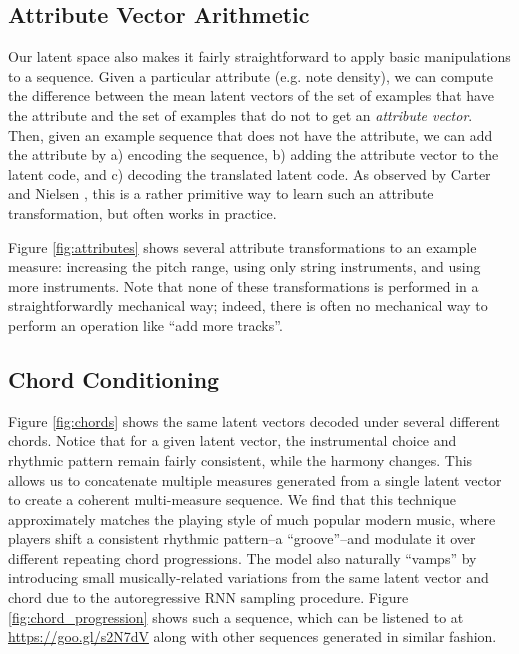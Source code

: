 \documentclass{article}
\begin{document}
\subsection{Attribute Vector Arithmetic}
\label{subsec:attribute}
Our latent space also makes it fairly straightforward to apply basic manipulations to a sequence.  Given a particular attribute (e.g. note density), we can compute the difference between the mean latent vectors of the set of examples that have the attribute and the set of examples that do not to get an {\it attribute vector}.  Then, given an example sequence that does not have the attribute, we can add the attribute by a) encoding the sequence, b) adding the attribute vector to the latent code, and c) decoding the translated latent code.  As observed by Carter and Nielsen \cite{carter2017using}, this is a rather primitive way to learn such an attribute transformation, but often works in practice.

Figure \ref{fig:attributes} shows several attribute transformations to an example measure: increasing the pitch range, using only string instruments, and using more instruments.  Note that none of these transformations is performed in a straightforwardly mechanical way; indeed, there is often no mechanical way to perform an operation like ``add more tracks''. 

\subsection{Chord Conditioning}
\label{subsec:chord_conditioning}

Figure \ref{fig:chords} shows the same latent vectors decoded under several different chords. Notice that for a given latent vector, the instrumental choice and rhythmic pattern remain fairly consistent, while the harmony changes. This allows us to concatenate multiple measures generated from a single latent vector to create a coherent multi-measure sequence.  We find that this technique approximately matches the playing style of much popular modern music, where players shift a consistent rhythmic pattern--a ``groove''--and modulate it over different repeating chord progressions.  The model also naturally ``vamps'' by introducing small musically-related variations from the same latent vector and chord due to the autoregressive RNN sampling procedure.  Figure \ref{fig:chord_progression} shows such a sequence, which can be listened to at \url{https://goo.gl/s2N7dV} along with other sequences generated in similar fashion.
\end{document}
